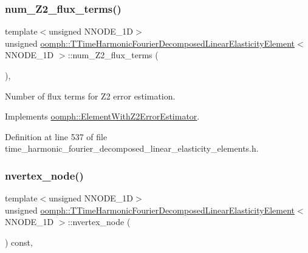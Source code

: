 \subsubsection{\texorpdfstring{num\+\_\+\+Z2\+\_\+flux\+\_\+terms()}{num\_Z2\_flux\_terms()}}
{\footnotesize\ttfamily template$<$unsigned N\+N\+O\+D\+E\+\_\+1D$>$ \\
unsigned \hyperlink{classoomph_1_1TTimeHarmonicFourierDecomposedLinearElasticityElement}{oomph\+::\+T\+Time\+Harmonic\+Fourier\+Decomposed\+Linear\+Elasticity\+Element}$<$ N\+N\+O\+D\+E\+\_\+1D $>$\+::num\+\_\+\+Z2\+\_\+flux\+\_\+terms (\begin{DoxyParamCaption}{ }\end{DoxyParamCaption})\hspace{0.3cm}{\ttfamily [inline]}, {\ttfamily [virtual]}}



Number of \textquotesingle{}flux\textquotesingle{} terms for Z2 error estimation. 



Implements \hyperlink{classoomph_1_1ElementWithZ2ErrorEstimator_ae82c5728902e13da31be19c390fc28e3}{oomph\+::\+Element\+With\+Z2\+Error\+Estimator}.



Definition at line 537 of file time\+\_\+harmonic\+\_\+fourier\+\_\+decomposed\+\_\+linear\+\_\+elasticity\+\_\+elements.\+h.

\mbox{\label{classoomph_1_1TTimeHarmonicFourierDecomposedLinearElasticityElement_a57870ab2c9c506070441d8a428820d27}} 
\subsubsection{\texorpdfstring{nvertex\+\_\+node()}{nvertex\_node()}}
{\footnotesize\ttfamily template$<$unsigned N\+N\+O\+D\+E\+\_\+1D$>$ \\
unsigned \hyperlink{classoomph_1_1TTimeHarmonicFourierDecomposedLinearElasticityElement}{oomph\+::\+T\+Time\+Harmonic\+Fourier\+Decomposed\+Linear\+Elasticity\+Element}$<$ N\+N\+O\+D\+E\+\_\+1D $>$\+::nvertex\+\_\+node (\begin{DoxyParamCaption}{ }\end{DoxyParamCaption}) const\hspace{0.3cm}{\ttfamily [inline]}, {\ttfamily [virtual]}}



